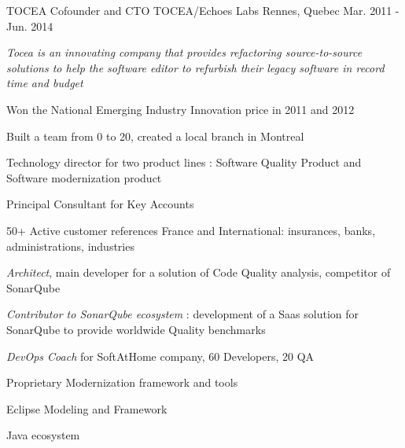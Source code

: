 \begin{cventries}
    \cventry        
    {TOCEA} %
    {Cofounder and CTO TOCEA/Echoes Labs} %
    {Rennes, Quebec} %
    {Mar. 2011 - Jun. 2014} %
    {
        \experience
            {
                \begin{cvitems} %
                    \item{\emph{Tocea is an innovating company that provides refactoring source-to-source solutions to help the software editor to refurbish their legacy software in record time and budget}}
                    \item{Won the National Emerging Industry Innovation price in 2011 and 2012}
                    \item{Built a team from 0 to 20, created a local branch in Montreal}
                    \item{Technology director for two product lines : Software Quality Product and Software modernization product}
                    \item{Principal Consultant for Key Accounts}
                    \item{50+ Active customer references France and International: insurances, banks, administrations, industries}
                \end{cvitems}
            }
            {
                \begin{cvitems} %
                \item {\emph{Architect}, main developer for a solution of Code Quality analysis, competitor of SonarQube }
                \item {\emph{Contributor to SonarQube ecosystem} : development of a Saas solution for SonarQube to provide worldwide Quality benchmarks}
                \item{\emph{DevOps Coach} for SoftAtHome company, 60 Developers, 20 QA}
                \end{cvitems}
            }
            {
                \begin{cvitems} %
                    \item{Proprietary Modernization framework and tools}
                    \item{Eclipse Modeling and Framework}
                    \item{Java ecosystem}
                \end{cvitems}
            }
    }


\end{cventries}
